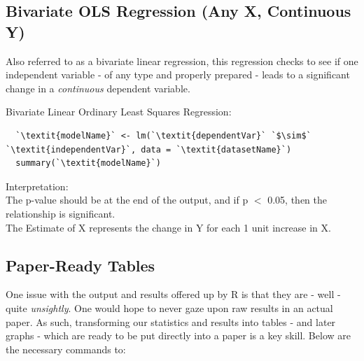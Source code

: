 \documentclass[12pt,letterpaper]{article}
\newcommand{\ind}{\phantom{AA}}
\begin{document}
\subsection{Bivariate OLS Regression (Any X, Continuous Y)}
Also referred to as a bivariate linear regression, this regression checks to see if one independent variable - of any type and properly prepared - leads to a significant change in a \textit{continuous} dependent variable.
\begin{tcolorbox}[title = OLS Regression]
Bivariate Linear Ordinary Least Squares Regression:
\begin{lstlisting}
  `\textit{modelName}` <- lm(`\textit{dependentVar}` `$\sim$` `\textit{independentVar}`, data = `\textit{datasetName}`) 
  summary(`\textit{modelName}`)
\end{lstlisting}
Interpretation:\\
\ind The p-value should be at the end of the output, and if p $<$ 0.05, then the \\ \ind relationship is significant.\\
\ind The Estimate of X represents the change in Y for each 1 unit increase in X.
\end{tcolorbox}


\subsection{Paper-Ready Tables}

One issue with the output and results offered up by R is that they are - well - quite \textit{unsightly}. One would hope to never gaze upon raw results in an actual paper. As such, transforming our statistics and results into tables - and later graphs - which are ready to be put directly into a paper is a key skill. Below are the necessary commands to:
\end{document}
